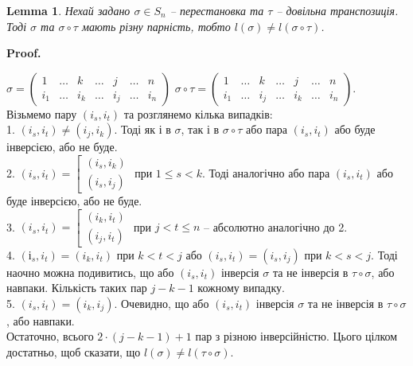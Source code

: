\documentclass[a4paper, 10pt]{article}
\makeatletter
\theoremstyle{theoremdd}
\theoremstyle{theoremdd}
\theoremstyle{theoremdd}
\theoremstyle{theoremdd}
\theoremstyle{theoremdd}
\theoremstyle{theoremdd}
\theoremstyle{theoremdd}
\theoremstyle{theoremdd}
\theoremstyle{theoremdd}
\theoremstyle{theoremdd}
\theoremstyle{theoremdd}
\theoremstyle{theoremdd}
\theoremstyle{theoremdd}
\newtheorem{lemma}[theorem]{Lemma}
\theoremstyle{theoremdd}
\theoremstyle{theoremdd}
\renewenvironment{proof}[1][Proof.\\]{\par
\pushQED{\hfill \qed}%
\normalfont \topsep6\p@\@plus6\p@\relax
\trivlist
\item\relax
{\bfseries
#1\@addpunct{.}}\hspace\labelsep\ignorespaces
}{%
\popQED\endtrivlist\@endpefalse
}
\makeatother
\begin{document}
\begin{lemma}
Нехай задано $\sigma \in S_n$ -- перестановка та $\tau$ -- довільна транспозиція. Тоді $\sigma$ та $\sigma \circ \tau$ мають різну парність, тобто $l(\sigma) \neq l(\sigma \circ \tau)$.
\end{lemma}

\begin{proof}
$\sigma = \begin{pmatrix}
1 & \dots & k & \dots & j & \dots & n \\
i_1 & \dots & i_k & \dots & i_j & \dots & i_n
\end{pmatrix}$ \hspace{1cm}  $\sigma \circ \tau = \begin{pmatrix}
1 & \dots & k & \dots & j & \dots & n \\
i_1 & \dots & i_j & \dots & i_k & \dots & i_n
\end{pmatrix}$.\\
Візьмемо пару $(i_s,i_t)$ та розглянемо кілька випадків:\\
1. $(i_s,i_t) \neq (i_j,i_k)$. Тоді як і в $\sigma$, так і в $\sigma \circ \tau$ або пара $(i_s,i_t)$ або буде інверсією, або не буде.\\
2. $(i_s,i_t) = \left[ \begin{gathered} (i_s,i_k) \\ (i_s,i_j) \end{gathered} \right.$ при $1 \leq s < k$. Тоді аналогічно або пара $(i_s,i_t)$ або буде інверсією, або не буде.\\
3. $(i_s,i_t) = \left[ \begin{gathered} (i_k,i_t) \\ (i_j,i_t) \end{gathered} \right.$ при $j < t \leq n$ -- абсолютно аналогічно до 2.\\
4. $(і_s,i_t) = (i_k, i_t)$ при $k < t < j$ або $(i_s,i_t) = (i_s,i_j)$ при $k < s < j$. Тоді наочно можна подивитись, що або $(i_s,i_t)$ інверсія $\sigma$ та не інверсія в $\tau \circ \sigma$, або навпаки. Кількість таких пар $j-k-1$  кожному випадку.\\
5. $(i_s,i_t) = (i_k,i_j)$. Очевидно, що або $(i_s,i_t)$ інверсія $\sigma$ та не інверсія в $\tau \circ \sigma$, або навпаки.\\
Остаточно, всього $2 \cdot (j-k-1) + 1$ пар з різною інверсійністю. Цього цілком достатньо, щоб сказати, що $l(\sigma) \neq l(\tau \circ \sigma)$.
\end{proof}
\end{document}
